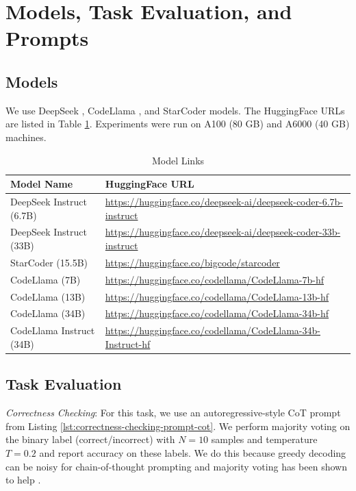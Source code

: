 \section{Models, Task Evaluation, and Prompts}\label{appendix:task-evaluation-prompts}
\subsection{Models}
We use DeepSeek \citep{guo2024deepseek}, CodeLlama \citep{roziere2023code}, and StarCoder \citep{li2023starcoder} models. The HuggingFace URLs are listed in Table \ref{tab:model-url-list}. Experiments were run on A100 (80 GB) and A6000 (40 GB) machines.
\begin{table}[h]
    \centering
    \small
    \caption{Model Links}
    \begin{tabular}{|ll|}
        \hline
        \textbf{Model Name} & \textbf{HuggingFace URL} \\
        \hline
        DeepSeek Instruct (6.7B) & \url{https://huggingface.co/deepseek-ai/deepseek-coder-6.7b-instruct} \\
        DeepSeek Instruct (33B) & \url{https://huggingface.co/deepseek-ai/deepseek-coder-33b-instruct} \\
        StarCoder (15.5B) & \url{https://huggingface.co/bigcode/starcoder} \\
        CodeLlama (7B) & \url{https://huggingface.co/codellama/CodeLlama-7b-hf} \\
        CodeLlama (13B) & \url{https://huggingface.co/codellama/CodeLlama-13b-hf} \\
        CodeLlama (34B) & \url{https://huggingface.co/codellama/CodeLlama-34b-hf} \\
        CodeLlama Instruct (34B) & \url{https://huggingface.co/codellama/CodeLlama-34b-Instruct-hf} \\
        \hline
    \end{tabular}
    \label{tab:model-url-list}
\end{table}


\subsection{Task Evaluation}
\label{sec:task-eval}
\textit{Correctness Checking}: For this task, we use an autoregressive-style CoT prompt from Listing \ref{lst:correctness-checking-prompt-cot}. We perform majority voting on the binary label (correct/incorrect) with $N=10$ samples and temperature $T=0.2$ and report accuracy on these labels. We do this because greedy decoding can be noisy for chain-of-thought prompting and majority voting has been shown to help \citep{wei2022chain, wang2022self}.

